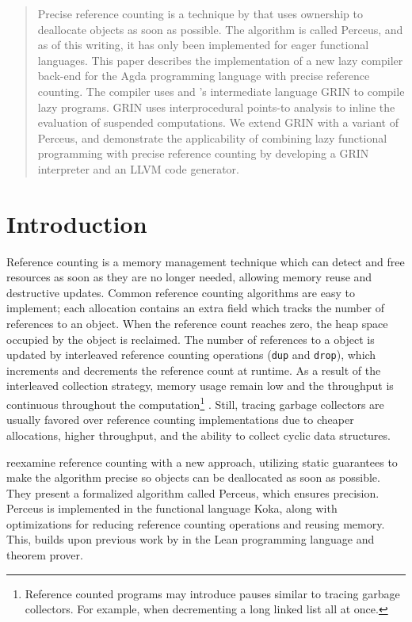\documentclass[10pt, twocolumn]{article}
\begin{document}
\begin{abstract}
Precise reference counting is a technique by \citeauthor{reinking2021} that uses ownership to deallocate objects as soon as possible. 
The algorithm is called Perceus, and as of this writing, it has only been implemented for eager functional languages.
This paper describes the implementation of a new lazy compiler back-end for the Agda programming language with 
precise reference counting. 
The compiler uses \citeauthor{boquist1999} and \citeauthor{johnsson1991}'s intermediate language GRIN to compile lazy programs. 
GRIN uses interprocedural points-to analysis to inline the evaluation of suspended computations.
We extend GRIN with a variant of Perceus, and demonstrate the applicability of combining lazy functional programming with precise reference counting by developing a GRIN interpreter and an LLVM code generator. 

\end{abstract}

\section{Introduction}

Reference counting \citep{collins1960} is a memory management technique which can detect and free resources as soon as they are no longer needed, allowing memory reuse and destructive updates. 
Common reference counting algorithms are easy to implement; each allocation contains an extra field which tracks the number of references to an object. 
When the reference count reaches zero, the heap space occupied by the object is reclaimed.
The number of references to a object is updated by interleaved reference counting operations (\texttt{dup} and \texttt{drop}), which increments and decrements the reference count at runtime. 
As a result of the interleaved collection strategy, memory usage remain low and the throughput is continuous throughout the computation\footnote{Reference counted programs may introduce pauses similar to tracing garbage collectors. For example, when decrementing a long linked list all at once.} \citep{jones1996}.
Still, tracing garbage collectors are usually favored over reference counting implementations due to cheaper allocations, higher throughput, and the ability to collect cyclic data structures.

\citet{reinking2021} reexamine reference counting with a new approach, utilizing static guarantees to make the algorithm precise so objects can be deallocated as soon as possible.
They present a formalized algorithm called Perceus, which ensures precision. 
Perceus is implemented in the functional language Koka, along with optimizations for reducing reference counting operations and reusing memory.
This, builds upon previous work by \citet{ullrich2021} in the Lean programming language and theorem prover. 
\end{document}
